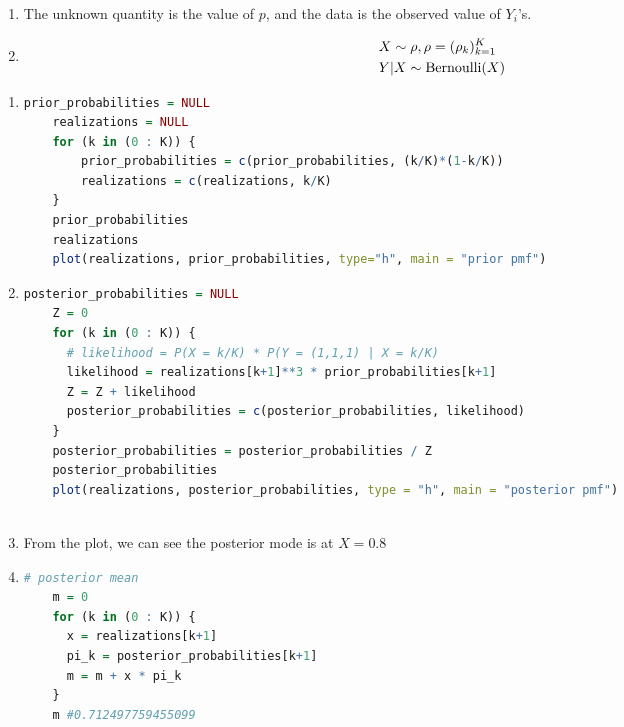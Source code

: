 \documentclass{article}
\begin{document}



\begin{enumerate}
  \item The unknown quantity is the value of $p$, and the data is the observed value of $Y_i$'s.
  \item \begin{align*}
  & X \sim \rho, \rho = (\rho_k)_{k=1}^K\\
  & Y | X \sim \operatorname{Bernoulli}(X)
  \end{align*}
\end{enumerate}

\begin{enumerate}
  \item 
  \begin{lstlisting}[language=R]
    prior_probabilities = NULL
    realizations = NULL
    for (k in (0 : K)) {
        prior_probabilities = c(prior_probabilities, (k/K)*(1-k/K))
        realizations = c(realizations, k/K)
    }
    prior_probabilities
    realizations
    plot(realizations, prior_probabilities, type="h", main = "prior pmf")
  \end{lstlisting}
  


  \item 
  \begin{lstlisting}[language=R]
    posterior_probabilities = NULL
    Z = 0
    for (k in (0 : K)) {
      # likelihood = P(X = k/K) * P(Y = (1,1,1) | X = k/K)
      likelihood = realizations[k+1]**3 * prior_probabilities[k+1]
      Z = Z + likelihood
      posterior_probabilities = c(posterior_probabilities, likelihood)
    }
    posterior_probabilities = posterior_probabilities / Z
    posterior_probabilities
    plot(realizations, posterior_probabilities, type = "h", main = "posterior pmf")
    
  \end{lstlisting}
  


  \item From the plot, we can see the posterior mode is at $X = 0.8$
  
  \item 
  \begin{lstlisting}[language=R]
    # posterior mean
    m = 0
    for (k in (0 : K)) {
      x = realizations[k+1]
      pi_k = posterior_probabilities[k+1]
      m = m + x * pi_k
    }
    m #0.712497759455099
    
  \end{lstlisting}
\end{enumerate}
\end{document}
